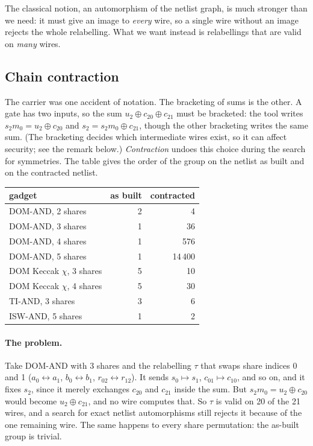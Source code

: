 \documentclass[11pt,a4paper]{article}
\theoremstyle{definition}
\theoremstyle{remark}
\begin{document}
The classical notion, an automorphism of the netlist graph, is much stronger than we need: it
must give an image to \emph{every} wire, so a single wire without an image rejects the whole
relabelling.  What we want instead is relabellings that are valid on \emph{many} wires.

\subsection{Chain contraction}\label{sec:contraction}

The carrier was one accident of notation.  The bracketing of sums is the other.  A gate has two
inputs, so the sum $u_2\oplus c_{20}\oplus c_{21}$ must be bracketed: the tool writes
$s_2m_0 = u_2\oplus c_{20}$ and $s_2 = s_2m_0\oplus c_{21}$, though the other bracketing writes
the same sum.  (The bracketing decides which intermediate wires exist, so it can affect security;
see the remark below.)  \emph{Contraction} undoes this choice during the search for symmetries.
The table gives the order of the group on the netlist as built and on the contracted netlist.
\begin{center}\small
\begin{tabular}{@{}lrr@{}}
\toprule
gadget & as built & contracted\\
\midrule
DOM-AND, 2 shares & 2 & 4\\
DOM-AND, 3 shares & 1 & 36\\
DOM-AND, 4 shares & 1 & 576\\
DOM-AND, 5 shares & 1 & 14\,400\\
DOM Keccak $\chi$, 3 shares & 5 & 10\\
DOM Keccak $\chi$, 4 shares & 5 & 30\\
TI-AND, 3 shares & 3 & 6\\
ISW-AND, 5 shares & 1 & 2\\
\bottomrule
\end{tabular}
\end{center}

\paragraph{The problem.}  Take DOM-AND with 3 shares and the relabelling $\tau$ that swaps share
indices 0 and 1 ($a_0\leftrightarrow a_1$, $b_0\leftrightarrow b_1$,
$r_{02}\leftrightarrow r_{12}$).  It sends $s_0\mapsto s_1$, $c_{01}\mapsto c_{10}$, and so on,
and it fixes $s_2$, since it merely exchanges $c_{20}$ and $c_{21}$ inside the sum.  But
$s_2m_0 = u_2\oplus c_{20}$ would become $u_2\oplus c_{21}$, and no wire computes that.  So
$\tau$ is valid on 20 of the 21 wires, and a search for exact netlist automorphisms still
rejects it because of the one remaining wire.  The same happens to every share permutation: the
as-built group is trivial.
\end{document}
